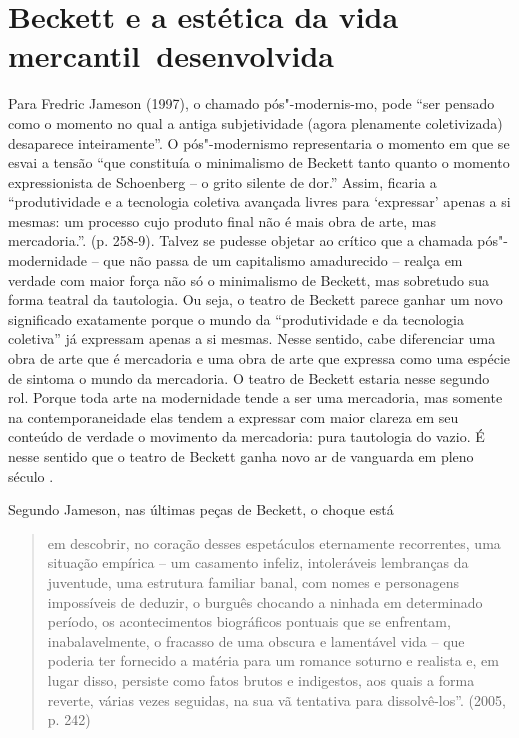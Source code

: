 \section{Beckett e a estética da vida mercantil~desenvolvida}

Para Fredric Jameson (1997), o chamado pós"-modernis-mo, pode ``ser %
pensado como o momento no qual a antiga subjetividade (agora plenamente
coletivizada) desaparece inteiramente''. O pós"-modernismo representaria
o momento em que se esvai a tensão ``que constituía o minimalismo de
Beckett tanto quanto o momento expressionista de Schoenberg -- o grito
silente de dor.'' Assim, ficaria a ``produtividade e a tecnologia
coletiva avançada livres para `expressar' apenas a si mesmas: um
processo cujo produto final não é mais obra de arte, mas mercadoria.''.
(p. 258-9). Talvez se pudesse objetar ao crítico que a chamada
pós"-modernidade -- que não passa de um capitalismo amadurecido -- realça
em verdade com maior força não só o minimalismo de Beckett, mas
sobretudo sua forma teatral da tautologia. Ou seja, o teatro de Beckett
parece ganhar um novo significado exatamente porque o mundo da
``produtividade e da tecnologia coletiva'' já expressam apenas a si
mesmas. Nesse sentido, cabe diferenciar uma obra de arte que é
mercadoria e uma obra de arte que expressa como uma espécie de sintoma o
mundo da mercadoria. O teatro de Beckett estaria nesse segundo rol.
Porque toda arte na modernidade tende a ser uma mercadoria, mas somente
na contemporaneidade elas tendem a expressar com maior clareza em seu
conteúdo de verdade o movimento da mercadoria: pura tautologia do vazio.
É nesse sentido que o teatro de Beckett ganha novo ar de vanguarda em
pleno século .

Segundo Jameson, nas últimas peças de Beckett, o choque está

\begin{quote}
em descobrir, no coração desses espetáculos eternamente recorrentes, uma
situação empírica -- um casamento infeliz, intoleráveis lembranças da
juventude, uma estrutura familiar banal, com nomes e personagens
impossíveis de deduzir, o burguês chocando a ninhada em determinado
período, os acontecimentos biográficos pontuais que se enfrentam,
inabalavelmente, o fracasso de uma obscura e lamentável vida -- que
poderia ter fornecido a matéria para um romance soturno e realista e, em
lugar disso, persiste como fatos brutos e indigestos, aos quais a forma
reverte, várias vezes seguidas, na sua vã tentativa para dissolvê-los''.
(2005, p. 242)
\end{quote}

